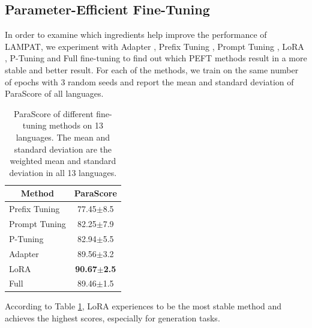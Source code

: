 \documentclass[letterpaper]{article} %
\begin{document}
\subsection{Parameter-Efficient Fine-Tuning}
In order to examine which ingredients help improve the performance of LAMPAT, we experiment with Adapter \citep{pmlr-v97-houlsby19a}, Prefix Tuning \citep{li-liang-2021-prefix}, Prompt Tuning \citep{lester-etal-2021-power}, LoRA \citep{hu2021lora}, P-Tuning \citep{liu-etal-2022-p} and Full fine-tuning to find out which PEFT methods result in a more stable and better result. For each of the methods, we train on the same number of epochs with 3 random seeds and report the mean and standard deviation of ParaScore of all languages.
\begin{table}[h!]
\centering
    {\fontsize{9pt}{9pt}\selectfont\begin{tabular}{|l|c|}
        \hline
        \multicolumn{1}{|c|}{Method} & ParaScore \\ \hline
        Prefix Tuning & 77.45$\pm$8.5 \\
        Prompt Tuning & 82.25$\pm$7.9 \\
        P-Tuning & 82.94$\pm$5.5 \\
        Adapter & 89.56$\pm$3.2 \\
        LoRA & \textbf{90.67$\pm$2.5} \\ 
        Full & 89.46$\pm$1.5 \\ \hline
    \end{tabular}}
\caption{ParaScore of different fine-tuning methods on 13 languages. The mean and standard deviation are the weighted mean and standard deviation in all 13 languages.}
\label{tab:ablation_study}
\end{table}

According to Table \ref{tab:ablation_study}, LoRA experiences to be the most stable method and achieves the highest scores, especially for generation tasks. %

\end{document}
